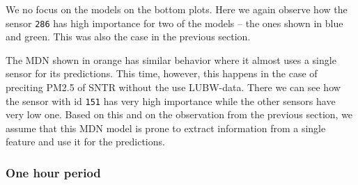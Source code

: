 \documentclass[12pt,a4paper,twoside]{scrartcl}
\numberwithin{equation}{section}
\begin{document}
We no focus on the models on the bottom plots. Here we again observe how the sensor \texttt{286} has high importance for two of the models -- the ones shown in blue and green. This was also the case in the previous section.

The MDN shown in orange has similar behavior where it almost uses a single sensor for its predictions. This time, however, this happens in the case of preciting PM2.5 of SNTR without the use LUBW-data. There we can see how the sensor with id \texttt{151} has very high importance while the other sensors have very low one. Based on this and on the observation from the previous section, we assume that this MDN model is prone to extract information from a single feature and use it for the predictions.
\subsubsection{One hour period}
\end{document}
